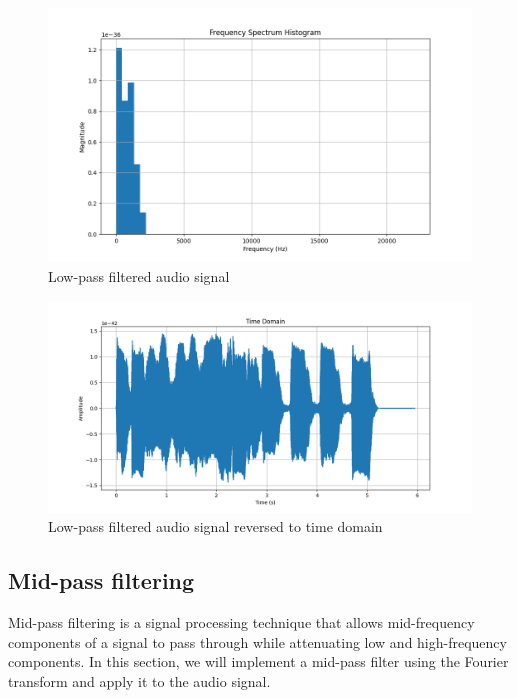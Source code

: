 \documentclass[a4paper,12pt,fleqn]{article}
\begin{document}
\begin{figure}[H]
    \centering
    \includegraphics[width=1\textwidth]{low_pass_filter.png}
    \caption{Low-pass filtered audio signal}
    \label{fig:low_pass_filter}
\end{figure}

\begin{figure}[H]
    \centering
    \includegraphics[width=1\textwidth]{low_pass_filter_time_domain.png}
    \caption{Low-pass filtered audio signal reversed to time domain}
    \label{fig:low_pass_filter_histogram}
\end{figure}

\newpage
\subsection{Mid-pass filtering}

\hspace{1 em}Mid-pass filtering is a signal processing technique that allows mid-frequency
components of a signal to pass through while attenuating low and high-frequency components.
In this section, we will implement a mid-pass filter using the Fourier transform and apply it
to the audio signal.
\end{document}
